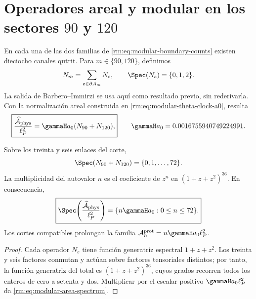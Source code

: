 \section{Operadores areal y modular en los sectores \texorpdfstring{\(90\)}{90} y \texorpdfstring{\(120\)}{120}}

En cada una de las dos familias de
\cref{rm:eq:modular-boundary-counts} existen dieciocho canales qutrit. Para
\(m\in\{90,120\}\), definimos
\begin{equation}
\label{rm:eq:modular-number-operators}
N_m=\sum_{e\in\partial A_m}N_e,
\qquad \Spec(N_e)=\{0,1,2\}.
\end{equation}
La salida de Barbero--Immirzi se usa aqu\'i como resultado previo, sin
rederivarla. Con la normalizaci\'on areal construida en
\cref{rm:eq:modular-theta-clock-a0}, resulta
\begin{equation}
\label{rm:eq:modular-area-operator}
\boxed{
\frac{\widehat{\mathcal A}_{\rm phys}}{\ell_P^2}
=\gammaH a_0(N_{90}+N_{120}),}
\qquad
\gammaH a_0=0.0016755940749224991.
\end{equation}

\begin{theorem}
\label{rm:thm:modular-area-spectrum}
Sobre los treinta y seis enlaces del corte,
\begin{equation}
\label{rm:eq:modular-total-number-spectrum}
\Spec(N_{90}+N_{120})=\{0,1,\ldots,72\}.
\end{equation}
La multiplicidad del autovalor \(n\) es el coeficiente de \(z^n\) en
\((1+z+z^2)^{36}\). En consecuencia,
\begin{equation}
\label{rm:eq:modular-area-spectrum}
\boxed{
\Spec\!\left(\frac{\widehat{\mathcal A}_{\rm phys}}{\ell_P^2}\right)
=\{n\gammaH a_0:0\leq n\leq72\}.}
\end{equation}
Los cortes compatibles prolongan la familia
\(\mathcal A_n^{\rm prot}=n\gammaH a_0\ell_P^2\).
\end{theorem}

\begin{proof}
Cada operador \(N_e\) tiene funci\'on generatriz espectral
\(1+z+z^2\). Los treinta y seis factores conmutan y act\'uan sobre factores
tensoriales distintos; por tanto, la funci\'on generatriz del total es
\((1+z+z^2)^{36}\), cuyos grados recorren todos los enteros de cero a
setenta y dos. Multiplicar por el escalar positivo
\(\gammaH a_0\ell_P^2\) da \cref{rm:eq:modular-area-spectrum}.
\end{proof}

